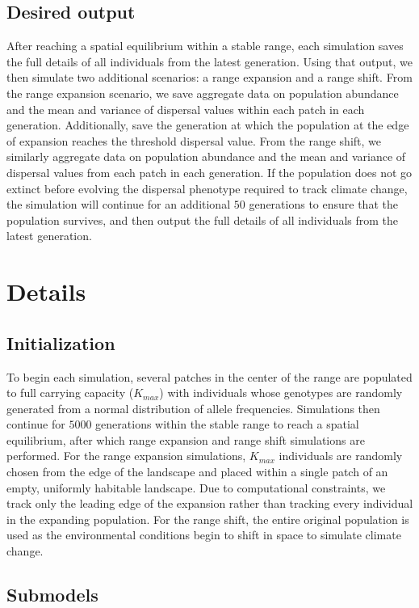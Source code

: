 \documentclass[11pt]{article}
\begin{document}
\subsection*{Desired output} 
After reaching a spatial equilibrium within a stable range, each simulation saves the full details of all individuals from the latest generation. Using that output, we then simulate two additional scenarios: a range expansion and a range shift. From the range expansion scenario, we save aggregate data on population abundance and the mean and variance of dispersal values within each patch in each generation. Additionally, save the generation at which the population at the edge of expansion reaches the threshold dispersal value. From the range shift, we similarly aggregate data on population abundance and the mean and variance of dispersal values from each patch in each generation. If the population does not go extinct before evolving the dispersal phenotype required to track climate change, the simulation will continue for an additional $50$ generations to ensure that the population survives, and then output the full details of all individuals from the latest generation.

\section*{Details}
\subsection*{Initialization} 
To begin each simulation, several patches in the center of the range are populated to full carrying capacity ($K_{max}$) with individuals whose genotypes are randomly generated from a normal distribution of allele frequencies. Simulations then continue for $5000$ generations within the stable range to reach a spatial equilibrium, after which range expansion and range shift simulations are performed. For the range expansion simulations, $K_{max}$ individuals are randomly chosen from the edge of the landscape and placed within a single patch of an empty, uniformly habitable landscape. Due to computational constraints, we track only the leading edge of the expansion rather than tracking every individual in the expanding population. For the range shift, the entire original population is used as the environmental conditions begin to shift in space to simulate climate change.

\subsection*{Submodels}
\end{document}
